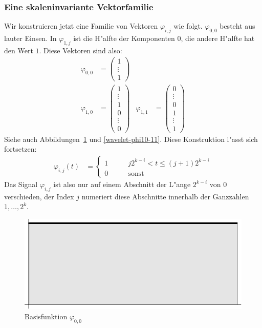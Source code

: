 \subsubsection{Eine skaleninvariante Vektorfamilie}
Wir konstruieren jetzt eine Familie von Vektoren $\varphi_{i,j}$
wie folgt. $\varphi_{0,0}$ besteht aus lauter Einsen. In $\varphi_{1,j}$
ist die H"alfte der Komponenten $0$, die andere H"alfte hat den
Wert $1$. 
Diese Vektoren sind also:
\begin{align*}
\varphi_{0,0}&=\begin{pmatrix}1\\\vdots\\1\end{pmatrix}
\\
\varphi_{1,0}&=\begin{pmatrix}1\\\vdots\\1\\0\\\vdots\\0\end{pmatrix}&
\varphi_{1,1}&=\begin{pmatrix}0\\\vdots\\0\\1\\\vdots\\1\end{pmatrix}
\end{align*}
Siehe auch Abbildungen~\ref{wavelet-phi00} und \ref{wavelet-phi10-11}.
Diese Konstruktion l"asst sich fortsetzen:
\begin{align*}
\varphi_{i,j}(t)&=\begin{cases}
1&\qquad j2^{k-i}<t\le (j+1)2^{k-i}\\
0&\qquad\text{sonst}
\end{cases}
\end{align*}
Das Signal $\varphi_{i,j}$ ist also nur auf einem Abschnitt der
L"ange $2^{k-i}$ von $0$ verschieden, der Index $j$ numeriert
diese Abschnitte innerhalb der Ganzzahlen $1,\dots,2^k$.
\begin{figure}
\begin{center}
\includegraphics[width=0.45\hsize]{images/w-1}
\end{center}
\caption{Basisfunktion $\varphi_{0,0}$\label{wavelet-phi00}}
\end{figure}
